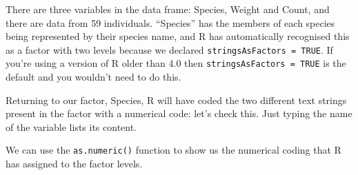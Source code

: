 \documentclass[
]{book}
\newenvironment{Shaded}{\begin{snugshade}}{\end{snugshade}}
\newcommand{\DecValTok}[1]{\textcolor[rgb]{0.00,0.00,0.81}{#1}}
\newcommand{\NormalTok}[1]{#1}
\newcommand{\OperatorTok}[1]{\textcolor[rgb]{0.81,0.36,0.00}{\textbf{#1}}}
\newcommand{\StringTok}[1]{\textcolor[rgb]{0.31,0.60,0.02}{#1}}
\begin{document}
There are three variables in the data frame: Species, Weight and Count, and there are data from 59 individuals. ``Species'' has the members of each species being represented by their species name, and R has automatically recognised this as a factor with two levels because we declared \texttt{stringsAsFactors\ =\ TRUE}. If you're using a version of R older than 4.0 then \texttt{stringsAsFactors\ =\ TRUE} is the default and you wouldn't need to do this.

Returning to our factor, Species, R will have coded the two different text strings present in the factor with a numerical code: let's check this. Just typing the name of the variable lists its content.

\begin{Shaded}
\end{Shaded}

We can use the \texttt{as.numeric()} function to show us the numerical coding that R has assigned to the factor levels.
\end{document}
